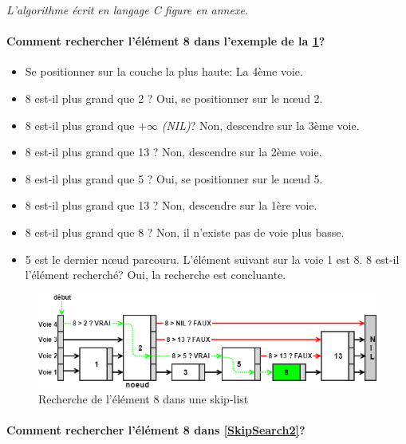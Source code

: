 \documentclass[hidelinks,a4paper, 12pt]{article}
\begin{document}
	\emph{L'algorithme écrit en langage C figure en annexe.}
	
	\paragraph*{Comment rechercher l'élément 8 dans l'exemple de la \cref{SkipSearch1}?}
	\begin{itemize}
		\item Se positionner sur la couche la plus haute: La 4ème voie.
		\item 8 est-il plus grand que 2 ? Oui, se positionner sur le nœud 2.
		\item 8 est-il plus grand que $+\infty$ \textit{(NIL)}? Non, descendre sur la 3ème voie.
		\item 8 est-il plus grand que 13  ? Non, descendre sur la 2ème voie.
		\item 8 est-il plus grand que 5 ? Oui, se positionner sur le nœud 5.
		\item 8 est-il plus grand que 13 ? Non, descendre sur la 1ère voie.
		\item 8 est-il plus grand que 8 ? Non, il n'existe pas de voie plus basse.
		\item 5 est le dernier nœud parcouru. L'élément suivant sur la voie 1 est 8. 8 est-il l'élément recherché? Oui, la recherche est concluante.
	\end{itemize}
	\begin{figure}[h]
		\includegraphics[width=\textwidth]{img/search}
		\caption{Recherche de l'élément 8 dans une skip-list}
		\label{SkipSearch1}
	\end{figure}
	
	\newpage
	\paragraph*{Comment rechercher l'élément 8 dans \cref{SkipSearch2}?}
	
\end{document}

